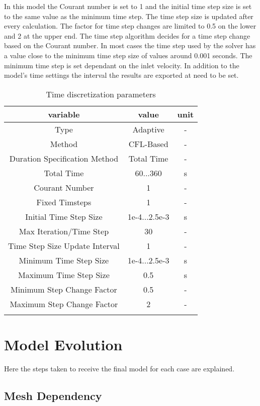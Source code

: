 \documentclass[../thesis.tex]{subfiles}
\begin{document}
In this model the Courant number is set to 1 and the initial time step size is set to the same value as the minimum time step. The time step size is updated after every calculation. The factor for time step changes are limited to 0.5 on the lower and 2 at the upper end. The time step algorithm decides for a time step change based on the Courant number. In most cases the time step used by the solver has a value close to the minimum time step size of values around 0.001 seconds. The minimum time step is set dependant on the inlet velocity. In addition to the model's time settings the interval the results are exported at need to be set.
\begin{table} [htb]
	\centering
	\caption{Time discretization parameters}
	\begin{tabular}{ ccc }
		\hline
		variable & value & unit \\
		\hline
		Type & Adaptive & - \\
		Method & CFL-Based & - \\
		Duration Specification Method & Total Time & -\\
		Total Time & 60...360 & s \\
		Courant Number & 1 & - \\
		Fixed Timsteps & 1 & - \\
		Initial Time Step Size & 1e-4...2.5e-3 & s \\
		Max Iteration/Time Step & 30 & - \\
		Time Step Size Update Interval & 1 & - \\
		Minimum Time Step Size & 1e-4...2.5e-3 & s \\
		Maximum Time Step Size & 0.5 & s \\
		Minimum Step Change Factor & 0.5 & - \\
		Maximum Step Change Factor & 2 & - \\		
		\hline
		\label{tab:ansys_setup_time}
	\end{tabular}
\end{table}

\section{Model Evolution}
\label{sec: mod_evol}

Here the steps taken to receive the final model for each case are explained.

\subsection{Mesh Dependency}
\label{sec: mesh_dep}
\end{document}
